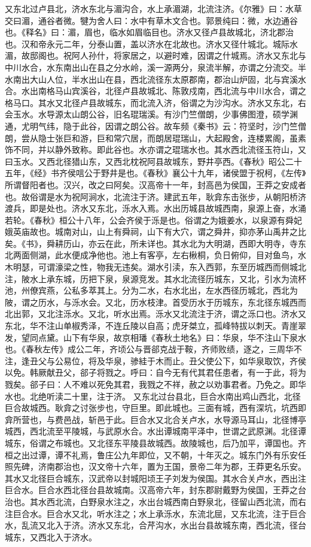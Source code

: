 \documentclass[12pt,UTF8]{ctexbook}
\begin{document}
又东北过卢县北，济水东北与湄沟合，水上承湄湖，北流注济。《尔雅》曰：水草交曰湄，通谷者微。犍为舍人曰：水中有草木文合也。郭景纯曰：微，水边通谷也。《释名》曰：湄，眉也，临水如眉临目也。济水又径卢县故城北，济北郡治也。汉和帝永元二年，分泰山置，盖以济水在北故也。济水又径什城北。城际水湄，故邸阁也。祝阿人孙什，将家居之，以避时难，因谓之什城焉。济水又东北与中川水合，水东南出山在县之分水岭，溪一源两分，泉流半解，亦谓之分流交。半水南出大山人位，半水出山在县，西北流径东太原郡南，郡治山炉固，北与宾溪水合。水出南格马山宾溪谷，北径卢县故城北、陈敦戍南，西北流与中川水合，谓之格马口。其水又北径卢县故城东，而北流入济，俗谓之为沙沟水。济水又东北，右会玉水。水导源太山朗公谷，旧名琨瑞溪。有沙门竺僧朗，少事佛图澄，硕学渊通，尤明气纬，隐于此谷，因谓之朗公谷。故车频《秦书》云：符坚时，沙门竺僧朗，尝从隐士张巨和游，巨和常穴居，而朗居琨瑞山，大起殿舍，连楼累阁，虽素饰不同，并以静外致称。即此谷也。水亦谓之琨瑞水也。其水西北流径玉符山，又曰玉水。又西北径猎山东，又西北枕祝阿县故城东，野井亭西。《春秋》昭公二十五年，《经》书齐侯唁公于野井是也。《春秋》襄公十九年，诸侯盟于祝柯，《左传》所谓督阳者也。汉兴，改之曰阿矣。汉高帝十一年，封高邑为侯国，王莽之安成者也。故俗谓是水为祝阿涧水，北流注于济。建武五年，耿弇东击张步，从朝阳桥济渡兵，即是处也。济水又东北，泺水入焉。水出历城县故城西南，泉源上奋，水涌若轮。《春秋》桓公十八年，公会齐侯于泺是也。俗谓之为娥姜水，以泉源有舜妃娥英庙故也。城南对山，山上有舜祠，山下有大穴，谓之舜井，抑亦茅山禹井之比矣。《书》，舜耕历山，亦云在此，所未详也。其水北为大明湖，西即大明寺，寺东北两面侧湖，此水便成净他也。池上有客亭，左右楸桐，负日俯仰，目对鱼鸟，水木明瑟，可谓濠梁之性，物我无违矣。湖水引渎，东入西郭，东至历城西而侧城北注，陂水上承东城，历把下泉，泉源竞发。其水北流径历城东，又北，引水为流杯池，州僚宾燕，公私多萃其上。分为二水，右水北出，左水西径历城北，西北为陂，谓之历水，与泺水会。又北，历水枝津。首受历水于历城东，东北径东城西而北出郭，又北注泺水。又北，听水出焉。泺水又北流注于济，谓之泺口也。济水又东北，华不注山单椒秀泽，不连丘陵以自高；虎牙桀立，孤峰特拔以刺天。青崖翠发，望同点黛。山下有华泉，故京相璠《春秋土地名》曰：华泉，华不注山下泉水也。《春秋左传》成公二年，齐顷公与晋郤克战于鞍，齐师败绩，逐之，三周华不注，逢丑父与公易位，将及华泉，骖絓于木而止。丑父使公下，如华泉取饮，齐侯以免。韩厥献丑父，郤子将戮之。呼曰：自今无有代其君任患者，有一于此，将为戮矣。郤子曰：人不难以死免其君，我戮之不祥，赦之以劝事君者。乃免之。即华水也。北绝听渎二十里，注于济。
又东北过台县北，巨合水南出鸡山西北，北径巨合故城西。耿弇之讨张步也，守巨里。即此城也。三面有城，西有深坑，坑西即弇所营也，与费邑战，斩邑于此。巨合水又北合关卢水，水导源马耳山，北径博亭城西，西北流至平陵城，与武原水合。水出谭城南平泽中，世谓之武原渊。北径谭城东，俗谓之布城也。又北径东平陵县故城西。故陵城也，后乃加平，谭国也。齐桓之出过谭，谭不礼焉，鲁庄公九年即位，又不朝，十年灭之。城东门外有乐安任照先碑，济南郡治也，汉文帝十六年，置为王国，景帝二年为郡，王莽更名乐安。其水又北径巨合城东，汉武帝以封城阳顷王子刘发为侯国。其水合关卢水，西出注巨合水。巨合水西北径台县故城南。汉高帝六年，封东郡尉戴野为侯国，王莽之台治也。其水西北流，白野泉水注之，水出台城西南白野泉北，径留山西北流，而右注巨合水。巨合水又北，听水注之；水上承泺水，东流北屈，又东北流，注于巨合水，乱流又北入于济。济水又东北，合芹沟水，水出台县故城东南，西北流，径台城东，又西北入于济水。
\end{document}
